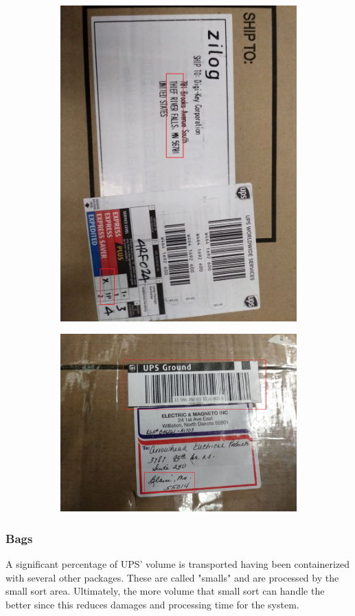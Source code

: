 \documentclass[12pt]{article}
\begin{document}
\begin{figure}[H]
\begin{subfigure}{0.5\textwidth}
\centering
\includegraphics[width=0.7\linewidth]{20171221_193129}
\caption{}
\end{subfigure}
\vspace{5mm}
\begin{subfigure}{0.5\textwidth}
\centering
\includegraphics[width=0.7\linewidth]{20171221_183147}
\caption{}
\end{subfigure}
\end{figure}
\clearpage
\subsubsection{Bags}
A significant percentage of UPS' volume is transported having been containerized with several other packages. These are called "smalls" and are processed by the small sort area. Ultimately, the more volume that small sort can handle the better since this reduces damages and processing time for the system.
\end{document}
